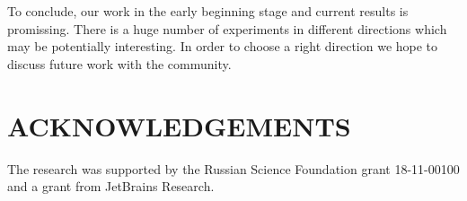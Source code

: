 \documentclass[a4paper,twoside]{article}
\begin{document}
To conclude, our work in the early beginning stage and current results is promissing. 
There is a huge number of experiments in different directions which may be potentially interesting.
In order to choose a right direction we hope to discuss future work with the community.


\section*{\uppercase{Acknowledgements}}

\noindent The research was supported by the Russian Science Foundation grant 18-11-00100 and a grant from JetBrains Research.




{\small
}


\vfill
\end{document}
